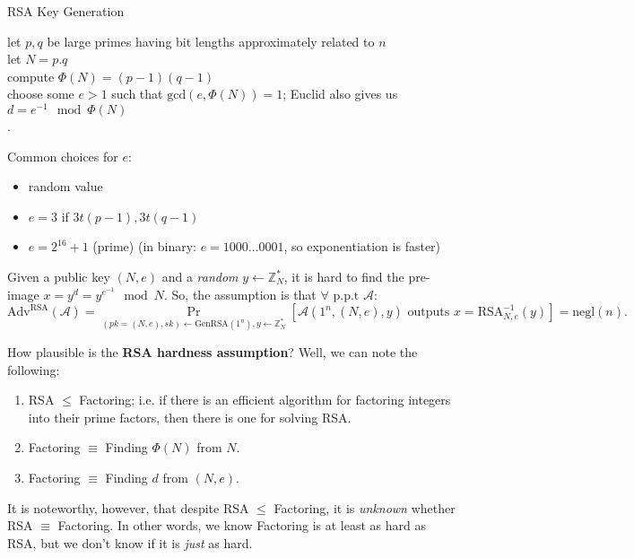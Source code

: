 \begin{algorithm}[H]\label{RSAKeyGen}
	\DontPrintSemicolon
	\caption{RSA Key Generation}
    let \(p, q\) be large primes having bit lengths approximately related to \(n\) \\
    let \(N=p.q\)\\
    compute \(\Phi (N) = (p-1)(q-1)\) \\
    choose some \(e > 1\) such that \(\text{gcd} (e, \Phi (N)) = 1\); Euclid also gives us \(d=e^{-1} \mod \Phi (N)\) \\
    .  
\end{algorithm}
\begin{remark}
    Common choices for \(e\):
    \begin{itemize}
        \item random value
        \item \(e=3\) if \(3t(p-1), 3t(q-1)\)
        \item \(e=2^{16} + 1\) (prime) (in binary: \(e=1000\ldots 0001\), so exponentiation is faster)
    \end{itemize}
\end{remark}

\begin{definition}
    Given a public key \((N,e)\) and a \emph{random} \(y \gets \mathbb{Z}_N^*\), it is hard to find the pre-image \(x=y^d=y^{e^{-1}} \mod N\). So, the assumption is that \(\forall \text{ p.p.t } \mathcal{A}\):
    \[
        \text{Adv}^{\text{RSA} } (\mathcal{A}) = \Pr_{(pk=(N,e), sk) \gets \text{GenRSA}(1^n), y \gets \mathbb{Z}_N^* } \left[ \mathcal{A}(1^n, (N, e), y) \text{ outputs } x=\text{RSA}_{N,e}^{-1}(y) \right] = \text{negl} (n).
    \] 
\end{definition}

How plausible is the \textbf{RSA hardness assumption}? Well, we can note the following:
\begin{enumerate}[label=(\roman*)]
    \item RSA \(\leq \) Factoring; i.e. if there is an efficient algorithm for factoring integers into their prime factors, then there is one for solving RSA.
    \item Factoring \(\equiv\) Finding \(\Phi (N)\) from \(N\).
    \item Factoring \(\equiv \) Finding \(d\) from \((N, e)\).
\end{enumerate}
\begin{remark}
    It is noteworthy, however, that despite RSA \(\leq \) Factoring, it is \emph{unknown} whether RSA \(\equiv \) Factoring. In other words, we know Factoring is at least as hard as RSA, but we don't know if it is \emph{just} as hard.
\end{remark}

